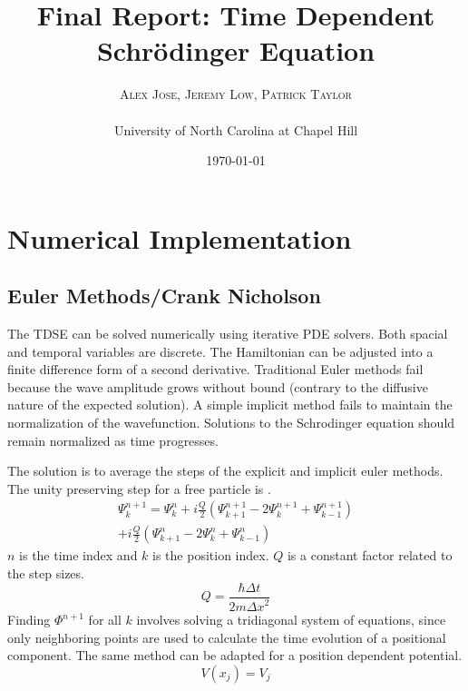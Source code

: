\documentclass[twoside,twocolumn]{article}
\title{Final Report:  Time Dependent Schr\"odinger Equation} %
\author{%
\textsc{Alex Jose, Jeremy Low, Patrick Taylor}\\[1ex] %
\textsc{}\\[1ex] %
\small{University of North Carolina at Chapel Hill}	%
}
\date{\today} %
\newcommand{\dx}{\Delta x}
\newcommand{\dt}{\Delta t}
\begin{document}
\maketitle

\section{Numerical Implementation}
\subsection{Euler Methods/Crank Nicholson}
The TDSE can be solved numerically using iterative PDE solvers. Both spacial and temporal variables are discrete. The Hamiltonian can be adjusted into a finite difference form of a second derivative. Traditional Euler methods fail because the wave amplitude grows without bound (contrary to the diffusive nature of the expected solution). A simple implicit method fails to maintain the normalization of the wavefunction. Solutions to the Schrodinger equation should remain normalized as time progresses.

The solution is to average the steps of the explicit and implicit euler methods.
The unity preserving step for a free particle is \cite{q3}.
\begin{equation}
	\begin{split}
	\Psi_{k}^{n+1} = \Psi_{k}^{n} + i\frac{Q}{2}(\Psi_{k+1}^{n+1}
	 - 2\Psi_{k}^{n+1} + \Psi_{k-1}^{n+1}) \\
	 + i\frac{Q}{2}(\Psi_{k+1}^{n}
	 - 2\Psi_{k}^{n} + \Psi_{k-1}^{n})  
 \end{split}
\end{equation}
$n$ is the time index and $k$ is the position index. $Q$ is a constant factor related to the step sizes.
\begin{equation}
	Q = \frac{\hbar \dt}{2 m {\dx}^2}
\end{equation}
Finding $\Phi^{n+1}$ for all $k$ involves solving a tridiagonal system of equations, since only neighboring points are used to calculate the time evolution of a positional component. The same method can be adapted for a position dependent potential.
\begin{equation}
	V(x_j) = V_{j}
\end{equation}
\end{document}
